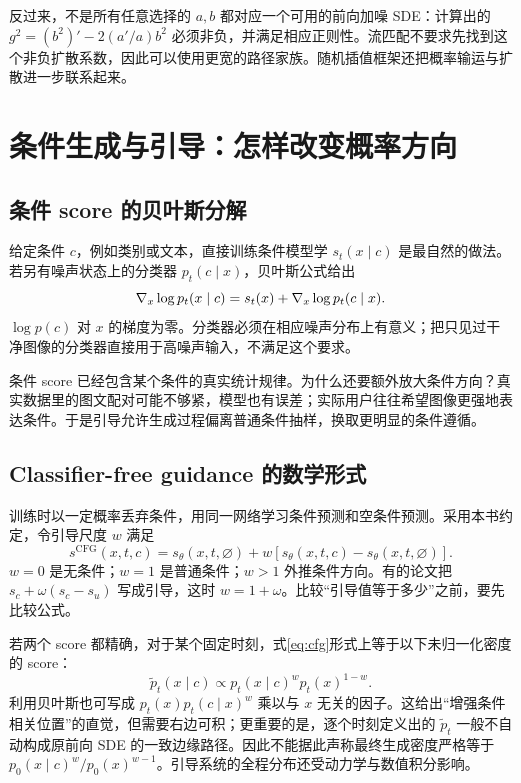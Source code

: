 反过来，不是所有任意选择的 $a,b$ 都对应一个可用的前向加噪 SDE：计算出的 $g^2=(b^2)'-2(a'/a)b^2$ 必须非负，并满足相应正则性。流匹配不要求先找到这个非负扩散系数，因此可以使用更宽的路径家族。随机插值框架还把概率输运与扩散进一步联系起来\cite{r_stochasticinterpolants}。

\section{条件生成与引导：怎样改变概率方向}\label{sec:guidance}
\subsection{条件 score 的贝叶斯分解}
给定条件 $c$，例如类别或文本，直接训练条件模型学 $s_t(x\mid c)$ 是最自然的做法。若另有噪声状态上的分类器 $p_t(c\mid x)$，贝叶斯公式给出
\begin{equation}
 \nabla_x\log p_t(x\mid c)=s_t(x)+\nabla_x\log p_t(c\mid x).
 \label{eq:classifier-guidance}
\end{equation}
$\log p(c)$ 对 $x$ 的梯度为零。分类器必须在相应噪声分布上有意义；把只见过干净图像的分类器直接用于高噪声输入，不满足这个要求。

条件 score 已经包含某个条件的真实统计规律。为什么还要额外放大条件方向？真实数据里的图文配对可能不够紧，模型也有误差；实际用户往往希望图像更强地表达条件。于是引导允许生成过程偏离普通条件抽样，换取更明显的条件遵循。

\subsection{Classifier-free guidance 的数学形式}
训练时以一定概率丢弃条件，用同一网络学习条件预测和空条件预测。采用本书约定，令引导尺度 $w$ 满足
\begin{equation}\boxed{
 s^{\mathrm{CFG}}(x,t,c)
 =s_\theta(x,t,\varnothing)+w\left[s_\theta(x,t,c)-s_\theta(x,t,\varnothing)\right].
 }\label{eq:cfg}\end{equation}
$w=0$ 是无条件；$w=1$ 是普通条件；$w>1$ 外推条件方向\cite{r_cfg}。有的论文把 $s_c+\omega(s_c-s_u)$ 写成引导，这时 $w=1+\omega$。比较“引导值等于多少”之前，要先比较公式。

若两个 score 都精确，对于某个固定时刻，式\eqref{eq:cfg}形式上等于以下未归一化密度的 score：
\begin{equation}
 \widetilde p_t(x\mid c)\propto p_t(x\mid c)^w p_t(x)^{1-w}.
\end{equation}
利用贝叶斯也可写成 $p_t(x)p_t(c\mid x)^w$ 乘以与 $x$ 无关的因子。这给出“增强条件相关位置”的直觉，但需要右边可积；更重要的是，逐个时刻定义出的 $\widetilde p_t$ 一般不自动构成原前向 SDE 的一致边缘路径。因此不能据此声称最终生成密度严格等于 $p_0(x\mid c)^w/p_0(x)^{w-1}$。引导系统的全程分布还受动力学与数值积分影响。


